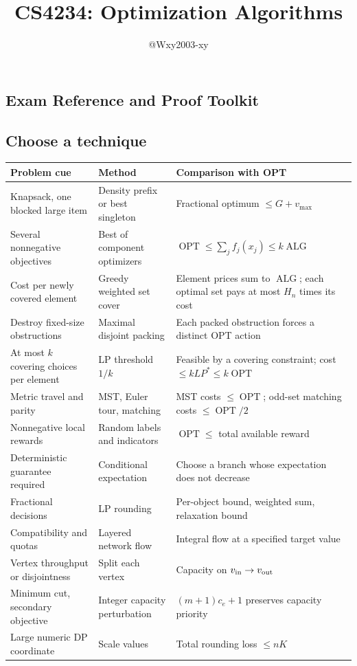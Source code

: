\documentclass[10pt]{article}
\title{CS4234: Optimization Algorithms}
\author{@Wxy2003-xy}
\date{}
\theoremstyle{definition}
\newcommand{\OPT}{\operatorname{OPT}}
\newcommand{\ALG}{\operatorname{ALG}}
\begin{document}
\maketitle\tableofcontents\clearpage
\begin{multicols*}{2}

\section{Exam Reference and Proof Toolkit}
\label{ref:toolkit}
\subsection{Choose a technique}
\begin{center}
\small
\begin{tabular}{P{0.25\textwidth}P{0.29\textwidth}P{0.35\textwidth}}
\toprule
\textbf{Problem cue} & \textbf{Method} & \textbf{Comparison with OPT}\\
\midrule
Knapsack, one blocked large item & Density prefix or best singleton & Fractional optimum $\le G+v_{\max}$\\
Several nonnegative objectives & Best of component optimizers & $\OPT\le\sum_j f_j(x_j)\le k\ALG$\\
Cost per newly covered element & Greedy weighted set cover & Element prices sum to $\ALG$; each optimal set pays at most $H_n$ times its cost\\
Destroy fixed-size obstructions & Maximal disjoint packing & Each packed obstruction forces a distinct OPT action\\
At most $k$ covering choices per element & LP threshold $1/k$ & Feasible by a covering constraint; cost $\le kLP^*\le k\OPT$\\
Metric travel and parity & MST, Euler tour, matching & MST costs $\le\OPT$; odd-set matching costs $\le\OPT/2$\\
Nonnegative local rewards & Random labels and indicators & $\OPT\le$ total available reward\\
Deterministic guarantee required & Conditional expectation & Choose a branch whose expectation does not decrease\\
Fractional decisions & LP rounding & Per-object bound, weighted sum, relaxation bound\\
Compatibility and quotas & Layered network flow & Integral flow at a specified target value\\
Vertex throughput or disjointness & Split each vertex & Capacity on $v_{\rm in}\to v_{\rm out}$\\
Minimum cut, secondary objective & Integer capacity perturbation & $(m+1)c_e+1$ preserves capacity priority\\
Large numeric DP coordinate & Scale values & Total rounding loss $\le nK$\\
\bottomrule
\end{tabular}
\end{center}


\end{multicols*}
\end{document}
